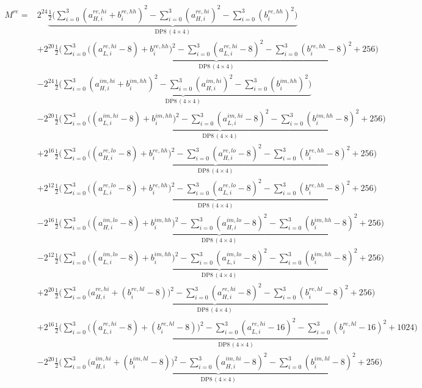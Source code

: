 \documentclass[fleqn]{article}
\newcommand{\DPop}[3]{\mathrm{DP#1}\,(#2\!\times\!#3)}
\begin{document}
\begin{align*}
M^{re} = {}
  & 2^{24}\underbrace{\tfrac12\Big(\sum_{i=0}^{3}(a_{H,i}^{re,hi}{+}b_i^{re,hh})^2 - \sum_{i=0}^{3}(a_{H,i}^{re,hi})^2 - \sum_{i=0}^{3}(b_i^{re,hh})^2\Big)}_{\DPop{8}{4}{4}} \\[0.35em]
  & + 2^{20}\underbrace{\tfrac12\Big(\sum_{i=0}^{3}\big((a_{L,i}^{re,hi}{-}8){+}b_i^{re,hh}\big)^2 - \sum_{i=0}^{3}(a_{L,i}^{re,hi}{-}8)^2 - \sum_{i=0}^{3}(b_i^{re,hh}{-}8)^2 + 256\Big)}_{\DPop{8}{4}{4}} \\[0.35em]
  & - 2^{24}\underbrace{\tfrac12\Big(\sum_{i=0}^{3}(a_{H,i}^{im,hi}{+}b_i^{im,hh})^2 - \sum_{i=0}^{3}(a_{H,i}^{im,hi})^2 - \sum_{i=0}^{3}(b_i^{im,hh})^2\Big)}_{\DPop{8}{4}{4}} \\[0.35em]
  & - 2^{20}\underbrace{\tfrac12\Big(\sum_{i=0}^{3}\big((a_{L,i}^{im,hi}{-}8){+}b_i^{im,hh}\big)^2 - \sum_{i=0}^{3}(a_{L,i}^{im,hi}{-}8)^2 - \sum_{i=0}^{3}(b_i^{im,hh}{-}8)^2 + 256\Big)}_{\DPop{8}{4}{4}} \\[0.35em]
  & + 2^{16}\underbrace{\tfrac12\Big(\sum_{i=0}^{3}\big((a_{H,i}^{re,lo}{-}8){+}b_i^{re,hh}\big)^2 - \sum_{i=0}^{3}(a_{H,i}^{re,lo}{-}8)^2 - \sum_{i=0}^{3}(b_i^{re,hh}{-}8)^2 + 256\Big)}_{\DPop{8}{4}{4}} \\[0.35em]
  & + 2^{12}\underbrace{\tfrac12\Big(\sum_{i=0}^{3}\big((a_{L,i}^{re,lo}{-}8){+}b_i^{re,hh}\big)^2 - \sum_{i=0}^{3}(a_{L,i}^{re,lo}{-}8)^2 - \sum_{i=0}^{3}(b_i^{re,hh}{-}8)^2 + 256\Big)}_{\DPop{8}{4}{4}} \\[0.35em]
  & - 2^{16}\underbrace{\tfrac12\Big(\sum_{i=0}^{3}\big((a_{H,i}^{im,lo}{-}8){+}b_i^{im,hh}\big)^2 - \sum_{i=0}^{3}(a_{H,i}^{im,lo}{-}8)^2 - \sum_{i=0}^{3}(b_i^{im,hh}{-}8)^2 + 256\Big)}_{\DPop{8}{4}{4}} \\[0.35em]
  & - 2^{12}\underbrace{\tfrac12\Big(\sum_{i=0}^{3}\big((a_{L,i}^{im,lo}{-}8){+}b_i^{im,hh}\big)^2 - \sum_{i=0}^{3}(a_{L,i}^{im,lo}{-}8)^2 - \sum_{i=0}^{3}(b_i^{im,hh}{-}8)^2 + 256\Big)}_{\DPop{8}{4}{4}} \\[0.35em]
  & + 2^{20}\underbrace{\tfrac12\Big(\sum_{i=0}^{3}\big(a_{H,i}^{re,hi}{+}(b_i^{re,hl}{-}8)\big)^2 - \sum_{i=0}^{3}(a_{H,i}^{re,hi}{-}8)^2 - \sum_{i=0}^{3}(b_i^{re,hl}{-}8)^2 + 256\Big)}_{\DPop{8}{4}{4}} \\[0.35em]
  & + 2^{16}\underbrace{\tfrac12\Big(\sum_{i=0}^{3}\big((a_{L,i}^{re,hi}{-}8){+}(b_i^{re,hl}{-}8)\big)^2 - \sum_{i=0}^{3}(a_{L,i}^{re,hi}{-}16)^2 - \sum_{i=0}^{3}(b_i^{re,hl}{-}16)^2 + 1024\Big)}_{\DPop{8}{4}{4}} \\[0.35em]
  & - 2^{20}\underbrace{\tfrac12\Big(\sum_{i=0}^{3}\big(a_{H,i}^{im,hi}{+}(b_i^{im,hl}{-}8)\big)^2 - \sum_{i=0}^{3}(a_{H,i}^{im,hi}{-}8)^2 - \sum_{i=0}^{3}(b_i^{im,hl}{-}8)^2 + 256\Big)}_{\DPop{8}{4}{4}} \\[0.35em]

\end{align*}
\end{document}
